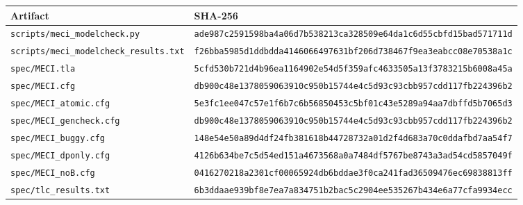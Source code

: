 \documentclass[11pt,letterpaper]{article}
\theoremstyle{plain}
\theoremstyle{definition}
\begin{document}
\begin{center}\small
\begin{tabular}{@{}ll@{}}
\toprule
Artifact & SHA-256\\
\midrule
\texttt{scripts/meci\_modelcheck.py} & {\scriptsize\texttt{ade987c2591598ba4a06d7b538213ca328509e64da1c6d55cbfd15bad571711d}}\\
\texttt{scripts/meci\_modelcheck\_results.txt} & {\scriptsize\texttt{f26bba5985d1ddbdda4146066497631bf206d738467f9ea3eabcc08e70538a1c}}\\
\texttt{spec/MECI.tla} & {\scriptsize\texttt{5cfd530b721d4b96ea1164902e54d5f359afc4633505a13f3783215b6008a45a}}\\
\texttt{spec/MECI.cfg} & {\scriptsize\texttt{db900c48e1378059063910c950b15744e4c5d93c93cbb957cdd117fb224396b2}}\\
\texttt{spec/MECI\_atomic.cfg} & {\scriptsize\texttt{5e3fc1ee047c57e1f6b7c6b56850453c5bf01c43e5289a94aa7dbffd5b7065d3}}\\
\texttt{spec/MECI\_gencheck.cfg} & {\scriptsize\texttt{db900c48e1378059063910c950b15744e4c5d93c93cbb957cdd117fb224396b2}}\\
\texttt{spec/MECI\_buggy.cfg} & {\scriptsize\texttt{148e54e50a89d4df24fb381618b44728732a01d2f4d683a70c0ddafbd7aa54f7}}\\
\texttt{spec/MECI\_dponly.cfg} & {\scriptsize\texttt{4126b634be7c5d54ed151a4673568a0a7484df5767be8743a3ad54cd5857049f}}\\
\texttt{spec/MECI\_noB.cfg} & {\scriptsize\texttt{0416270218a2301cf00065924db6bddae3f0ca241fad36509476ec69838813ff}}\\
\texttt{spec/tlc\_results.txt} & {\scriptsize\texttt{6b3ddaae939bf8e7ea7a834751b2bac5c2904ee535267b434e6a77cfa9934ecc}}\\
\bottomrule
\end{tabular}
\end{center}
\end{document}

